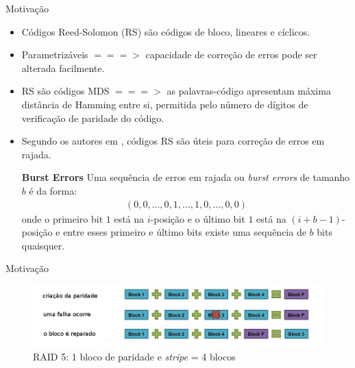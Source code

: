   \begin{frame}{Motivação}
     \begin{itemize}
        \item Códigos Reed-Solomon (RS) são códigos de bloco, lineares e cíclicos.
        \item Parametrizáveis $===>$ capacidade de correção de erros pode ser alterada facilmente.
        \item RS são códigos MDS $===>$ as palavras-código apresentam máxima distância de Hamming entre si, permitida pelo número de dígitos de verificação de paridade do código.
        \item Segundo os autores em \cite{Almeida:2007,Sloane:1977}, códigos RS são úteis para correção de erros em rajada.
\begin{definition} {\bf Burst Errors}  Uma sequência de erros em rajada ou \emph{burst errors} de tamanho $b$ é da forma:
    \begin{align*}
     (0, 0, \ldots, 0, 1, \ldots , 1, 0, \ldots, 0, 0)
    \end{align*}
onde o primeiro bit $1$ está na $i$-posição e o último bit $1$ está na $(i+b-1)$-posição e entre esses primeiro e último bits existe uma sequência de $b$ bits quaisquer.
\end{definition}
     \end{itemize}
  \end{frame}


 \begin{frame}{Motivação}
    \begin{figure}[hb]
      \centering
      \includegraphics[scale=0.35]{raid5.jpg}
      \caption{RAID 5: 1 bloco de paridade e \emph{stripe} = 4 blocos \cite{MR-2036:2010}}
      \label{fig5:raid5}
    \end{figure}
 \end{frame}


